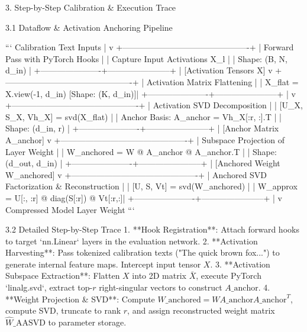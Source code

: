  3. Step-by-Step Calibration \& Execution Trace


 3.1 Dataflow \& Activation Anchoring Pipeline

```
              Calibration Text Inputs
                         |
                         v
  +----------------------------------------------+
  | Forward Pass with PyTorch Hooks              |
  |   Capture Input Activations X\_l              |
  |   Shape: (B, N, d\_in)                        |
  +----------------------+-----------------------+
                         |  [Activation Tensors X]
                         v
  +----------------------------------------------+
  | Activation Matrix Flattening                 |
  |   X\_flat = X.view(-1, d\_in)  [Shape: (K, d\_in)]|
  +----------------------+-----------------------+
                         |
                         v
  +----------------------------------------------+
  | Activation SVD Decomposition                 |
  |   [U\_X, S\_X, Vh\_X] = svd(X\_flat)             |
  |   Anchor Basis: A\_anchor = Vh\_X[:r, :].T     |
  |   Shape: (d\_in, r)                           |
  +----------------------+-----------------------+
                         |  [Anchor Matrix A\_anchor]
                         v
  +----------------------------------------------+
  | Subspace Projection of Layer Weight          |
  |   W\_anchored = W @ A\_anchor @ A\_anchor.T     |
  |   Shape: (d\_out, d\_in)                       |
  +----------------------+-----------------------+
                         |  [Anchored Weight W\_anchored]
                         v
  +----------------------------------------------+
  | Anchored SVD Factorization \& Reconstruction  |
  |   [U, S, Vt] = svd(W\_anchored)               |
  |   W\_approx = U[:, :r] @ diag(S[:r]) @ Vt[:r,:]|
  +----------------------+-----------------------+
                         |
                         v
              Compressed Model Layer Weight
```

 3.2 Detailed Step-by-Step Trace
1. **Hook Registration**: Attach forward hooks to target `nn.Linear` layers in the evaluation network.
2. **Activation Harvesting**: Pass tokenized calibration texts ("The quick brown fox...") to generate internal feature maps. Intercept input tensor $X$.
3. **Activation Subspace Extraction**: Flatten $X$ into 2D matrix $\bar{X}$, execute PyTorch `linalg.svd`, extract top-$r$ right-singular vectors to construct $A\_{\text{anchor}}$.
4. **Weight Projection \& SVD**: Compute $W\_{\text{anchored}} = W A\_{\text{anchor}} A\_{\text{anchor}}^T$, compute SVD, truncate to rank $r$, and assign reconstructed weight matrix $\hat{W}\_{\text{AASVD}}$ to parameter storage.

